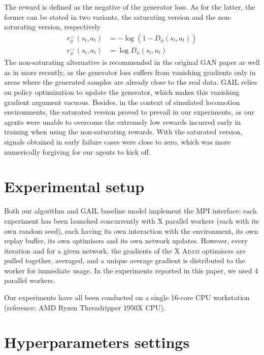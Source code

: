 The reward is defined as the negative of the generator loss.
As for the latter, the former can be stated in two variants,
the saturating version and the non-saturating version, respectively
\begin{align}
  r_\phi^\smallfrown(s_t, a_t) & = - \log (1 - D_\phi(s_t, a_t))
  \\
  r_\phi^\smallsmile(s_t, a_t) & = \log D_\phi(s_t, a_t)
  \label{eq:rewards}
\end{align}
The non-saturating alternative is recommended in the original GAN paper as well
as in \cite{Fedus2018-bk} more recently, as the generator loss suffers from
vanishing gradients only in areas where the generated samples are already close
to the real data.
GAIL relies on policy optimization to update the generator, which makes this
vanishing gradient argument vacuous.
Besides, in the context of simulated locomotion environments, the
saturated version proved to prevail in our experiments, as our agents were
unable to overcome the extremely low rewards incurred early in training when
using the non-saturating rewards.
With the saturated version, signals obtained in early failure cases were close
to zero, which was more numerically forgiving for our agents to kick off.

\section{Experimental setup}

Both our algorithm and GAIL baseline model implement the MPI interface:
each experiment has
been launched concurrently with X parallel workers
(each with its own random seed),
each having its own
interaction with the environment, its own replay buffer, its own optimisers
and its own network updates.
However, every iteration and for a given network,
the gradients of the X \textsc{Adam}
\cite{Kingma2014-op} optimisers are pulled together, averaged, and a unique
average gradient is distributed to the worker for immediate usage.
In the experiments reported in this paper, we used 4 parallel workers.

Our experiments have all been conducted on a single 16-core CPU
workstation (reference: AMD Ryzen Threadripper\textsuperscript{\textregistered}
1950X CPU).

\section{Hyperparameters settings}

